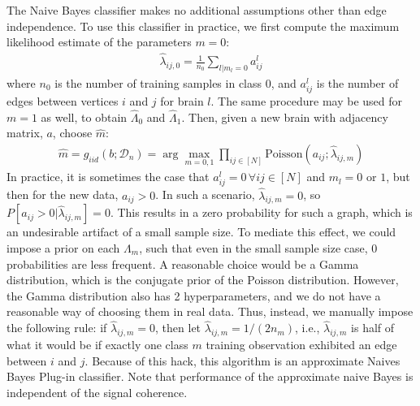 \documentclass{article}
\newcommand{\mD}{\mathcal{D}}
\newcommand{\hm}{\widehat{m}}
\newcommand{\lam}{\lambda}
\newcommand{\Lam}{\Lambda}
\newcommand{\hlam}{\widehat{\lambda}}
\newcommand{\hLam}{\widehat{\Lambda}}
\begin{document}
The Naive Bayes classifier makes no additional assumptions other than edge independence.  To use this classifier in practice, we first compute the maximum likelihood estimate of the parameters $m=0$:
\begin{align}
	\hlam_{ij,0} = \frac{1}{n_0}\sum_{l | m_l = 0} a_{ij}^l
\end{align}
where $n_0$ is the number of training samples in class $0$, and $a_{ij}^l$ is the number of edges between vertices $i$ and $j$ for brain $l$.  The same procedure may be used for $m=1$ as well, to obtain $\hLam_0$ and $\hLam_1$.  Then, given a new brain with adjacency matrix, $a$, choose $\hm$:
\begin{align}
	\hm = g_{iid}(b; \mD_n) = \arg \max_{m=0,1} \prod_{ij \in [N]} \text{Poisson}(a_{ij}; \hlam_{ij,m})
\end{align}
In practice, it is sometimes the case that $a_{ij}^l=0 \, \forall ij \in [N]$ and $m_l = 0$ or $1$, but then for the new data, $a_{ij}>0$.  In such a scenario, $\hlam_{ij,m}=0$, so $P[a_{ij} > 0 | \hlam_{ij,m}]=0$.  This results in a zero probability for such a graph, which is an undesirable artifact of a small sample size.  To mediate this effect, we could impose a prior on each $\Lam_m$, such that even in the small sample size case, $0$ probabilities are less frequent.  A reasonable choice would be a Gamma distribution, which is the conjugate prior of the Poisson distribution.  However, the Gamma distribution also has 2 hyperparameters, and we do not have a reasonable way of choosing them in real data.  Thus, instead, we manually impose the following rule: if $\hlam_{ij,m}=0$, then let $\hlam_{ij,m}=1/(2 n_m)$, i.e., $\hlam_{ij,m}$ is half of what it would be if exactly one class $m$ training observation exhibited an edge between $i$ and $j$. Because of this hack, this algorithm is an approximate Naives Bayes Plug-in classifier.  Note that performance of the approximate naive Bayes is independent of the signal coherence.
% 
\end{document}
